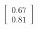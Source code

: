 \documentclass[preview]{standalone}
\begin{document}
\begin{align*}
\begin{bmatrix} 0.67 \\ 0.81 \end{bmatrix}
\end{align*}
\end{document}
